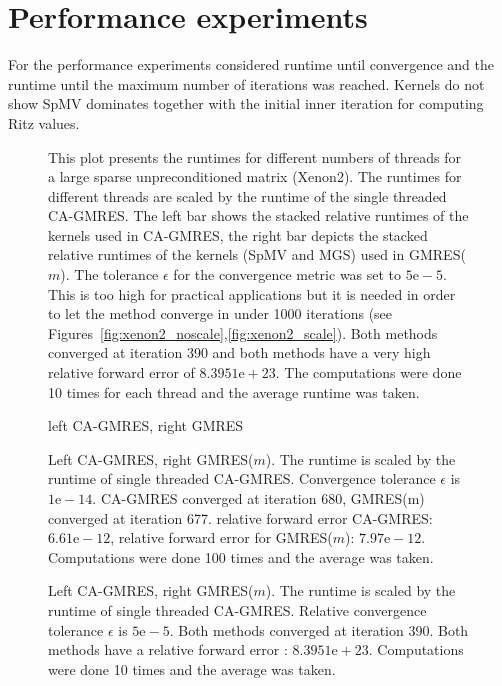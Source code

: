 \documentclass{scrartcl}
\numberwithin{equation}{section}
\begin{document}
\section{Performance experiments}
For the performance experiments considered runtime until convergence and the runtime until the maximum number of iterations was reached. Kernels do not show SpMV dominates together with the initial inner iteration for computing Ritz values.
\begin{figure}[H]
	\centering
	\resizebox{1.0\textwidth}{!}{}
	\caption{This plot presents the runtimes for different numbers of threads for a large sparse unpreconditioned matrix (Xenon2). The runtimes for different threads are scaled by the runtime of the single threaded CA-GMRES. The left bar shows the stacked relative runtimes of the kernels used in CA-GMRES, the right bar depicts the stacked relative runtimes of the kernels (SpMV and MGS) used in GMRES($m$). The tolerance $\epsilon$ for the convergence metric was set to $5\text{e}-5$. This is too high for practical applications but it is needed in order to let the method converge in under 1000 iterations (see Figures~\ref{fig:xenon2_noscale},\ref{fig:xenon2_scale}). Both methods converged at iteration 390 and both methods have a very high relative forward error of $ 8.3951\text{e}+23$. The computations were done 10 times for each thread and the average runtime was taken.}
\end{figure}


\begin{figure}[H]
	\centering
	\resizebox{1.0\textwidth}{!}{}
	\caption{left CA-GMRES, right GMRES}
\end{figure}

\begin{figure}[H]
	\centering
	\resizebox{1.0\textwidth}{!}{}
	\caption{Left CA-GMRES, right GMRES($m$). The runtime is scaled by the runtime of single threaded CA-GMRES. Convergence tolerance $\epsilon$ is $1\text{e}-14$. CA-GMRES converged at iteration 680, GMRES(m) converged at iteration 677. relative forward error CA-GMRES: $6.61\text{e}-12$, relative forward error for GMRES($m$): $7.97\text{e}-12$. Computations were done 100 times and the average was taken.
 }
	\label{fig:runtimes_threads_sherman3}
\end{figure}

\begin{figure}[H]
	\centering
	\resizebox{1.0\textwidth}{!}{}
	\caption{Left CA-GMRES, right GMRES($m$). The runtime is scaled by the runtime of single threaded CA-GMRES. Relative convergence tolerance $\epsilon$ is $5\text{e}-5$. Both methods converged at iteration 390. Both methods have a relative forward error : $ 8.3951\text{e}+23$. Computations were done 10 times and the average was taken.}
	\label{fig:runtimes_threads_xenon2}
\end{figure}
\end{document}
